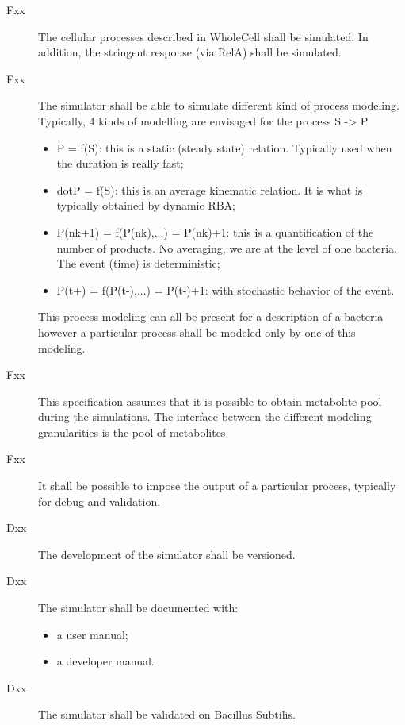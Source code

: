 \begin{description}
  \item[Fxx] The cellular processes described in WholeCell shall be simulated. In addition, the stringent response (via RelA) shall be simulated.
  \item[Fxx] The simulator shall be able to simulate different kind of process modeling. Typically, 4 kinds of modelling are envisaged for the process S -> P
  \begin{itemize}
    \item P = f(S): this is a static (steady state) relation. Typically used when the duration is really fast;
    \item dot{P} = f(S): this is an average kinematic relation. It is what is typically obtained by dynamic RBA;
    \item P(nk+1) = f(P(nk),...) = P(nk)+1: this is a quantification of the number of products. No averaging, we are at the level of one bacteria. The event (time) is deterministic;
    \item P(t+) = f(P(t-),...) = P(t-)+1: with stochastic behavior of the event.
  \end{itemize}
      This process modeling can all be present for a description of a bacteria however a particular process shall be modeled only by one of this modeling.
  \item[Fxx] This specification assumes that it is possible to obtain metabolite pool during the simulations. The interface between the different modeling granularities is the pool of metabolites.
  \item[Fxx] It shall be possible to impose the output of a particular process, typically for debug and validation.
  \\
  
  \item[Dxx] The development of the simulator shall be versioned.
  \item[Dxx] The simulator shall be documented with:
  \begin{itemize}
    \item a user manual;
    \item a developer manual.
  \end{itemize}
  \item[Dxx] The simulator shall be validated on Bacillus Subtilis.
\end{description}


